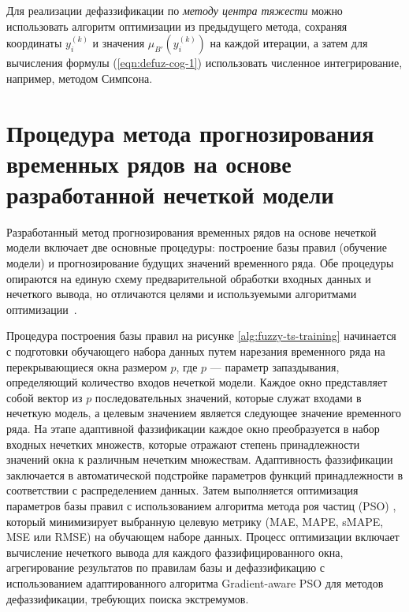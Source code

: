 Для реализации дефаззификации по \textit{методу центра тяжести} можно использовать алгоритм оптимизации из предыдущего метода, сохраняя координаты $y_i^{(k)}$ и значения $\mu_{B'}(y_i^{(k)})$ на каждой итерации, а затем для вычисления формулы (\ref{eqn:defuz-cog-1}) использовать численное интегрирование, например, методом Симпсона.

\section{Процедура метода прогнозирования временных рядов на основе разработанной нечеткой модели}

Разработанный метод прогнозирования временных рядов на основе нечеткой модели включает две основные процедуры: построение базы правил (обучение модели) и прогнозирование будущих значений временного ряда. Обе процедуры опираются на единую схему предварительной обработки входных данных и нечеткого вывода, но отличаются целями и используемыми алгоритмами оптимизации~\cite{BoseMali2019,YarushevNeuroFuzzyTS}.

Процедура построения базы правил на рисунке \cref{alg:fuzzy-ts-training} начинается с подготовки обучающего набора данных путем нарезания временного ряда на перекрывающиеся окна размером $p$, где $p$ --- параметр запаздывания, определяющий количество входов нечеткой модели. Каждое окно представляет собой вектор из $p$ последовательных значений, которые служат входами в нечеткую модель, а целевым значением является следующее значение временного ряда. На этапе адаптивной фаззификации каждое окно преобразуется в набор входных нечетких множеств, которые отражают степень принадлежности значений окна к различным нечетким множествам. Адаптивность фаззификации заключается в автоматической подстройке параметров функций принадлежности в соответствии с распределением данных. Затем выполняется оптимизация параметров базы правил с использованием алгоритма метода роя частиц (PSO) \cite{Kennedy1995}, который минимизирует выбранную целевую метрику (MAE, MAPE, sMAPE, MSE или RMSE) \cite{Hyndman2006} на обучающем наборе данных. Процесс оптимизации включает вычисление нечеткого вывода для каждого фаззифицированного окна, агрегирование результатов по правилам базы и дефаззификацию с использованием адаптированного алгоритма Gradient-aware PSO для методов дефаззификации, требующих поиска экстремумов.

